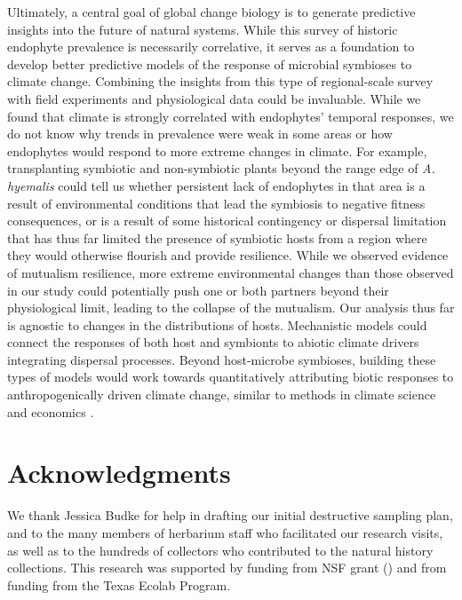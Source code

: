 \documentclass[11pt]{article}
\begin{document}
Ultimately, a central goal of global change biology is to generate predictive insights into the future of natural systems. 
While this survey of historic endophyte prevalence is necessarily correlative, it serves as a foundation to develop better predictive models of the response of microbial symbioses to climate change. 
Combining the insights from this type of regional-scale survey with field experiments and physiological data could be invaluable. 
While we found that climate is strongly correlated with endophytes' temporal responses, we do not know why trends in prevalence were weak in some areas or how endophytes would respond to more extreme changes in climate.
For example, transplanting symbiotic and non-symbiotic plants beyond the range edge of \emph{A. hyemalis} could tell us whether persistent lack of endophytes in that area is a result of environmental conditions that lead the symbiosis to negative fitness consequences, or is a result of some historical contingency or dispersal limitation that has thus far limited the presence of symbiotic hosts from a region where they would otherwise flourish and provide resilience.
While we observed evidence of mutualism resilience, more extreme environmental changes than those observed in our study could potentially push one or both partners beyond their physiological limit, leading to the collapse of the mutualism. 
Our analysis thus far is agnostic to changes in the distributions of hosts. 
Mechanistic models could connect the responses of both host and symbionts to abiotic climate drivers integrating dispersal processes. 
Beyond host-microbe symbioses, building these types of models would work towards quantitatively attributing biotic responses to anthropogenically driven climate change, similar to methods in climate science and economics \citep{stott2010detection, carleton2016social}.



	
	\section*{Acknowledgments}
	We thank Jessica Budke for help in drafting our initial destructive sampling plan, and to the many members of herbarium staff who facilitated our research visits, as well as to the hundreds of collectors who contributed to the natural history collections. 
	This research was supported by funding from NSF grant () and from funding from the Texas Ecolab Program.
\end{document}
